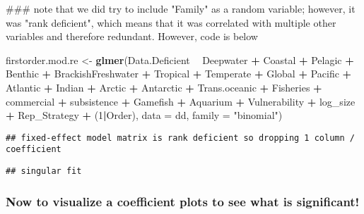 \documentclass[]{article}
\newenvironment{Shaded}{\begin{snugshade}}{\end{snugshade}}
\newcommand{\KeywordTok}[1]{\textcolor[rgb]{0.13,0.29,0.53}{\textbf{#1}}}
\newcommand{\DataTypeTok}[1]{\textcolor[rgb]{0.13,0.29,0.53}{#1}}
\newcommand{\DecValTok}[1]{\textcolor[rgb]{0.00,0.00,0.81}{#1}}
\newcommand{\StringTok}[1]{\textcolor[rgb]{0.31,0.60,0.02}{#1}}
\newcommand{\OperatorTok}[1]{\textcolor[rgb]{0.81,0.36,0.00}{\textbf{#1}}}
\newcommand{\NormalTok}[1]{#1}
\begin{document}
\begin{Shaded}
\begin{Highlighting}[]
\NormalTok{### note that we did try to include "Family" as a random variable; however, it was "rank deficient", which means that it was correlated with multiple other variables and therefore redundant. However, code is below}

\NormalTok{firstorder.mod.re <-}\StringTok{ }\KeywordTok{glmer}\NormalTok{(Data.Deficient }\OperatorTok{~}\StringTok{ }\NormalTok{Deepwater }\OperatorTok{+}\StringTok{ }\NormalTok{Coastal }\OperatorTok{+}\StringTok{ }\NormalTok{Pelagic }\OperatorTok{+}\StringTok{ }\NormalTok{Benthic }\OperatorTok{+}\StringTok{ }\NormalTok{BrackishFreshwater }\OperatorTok{+}\StringTok{ }
\StringTok{      }\NormalTok{Tropical }\OperatorTok{+}\StringTok{ }\NormalTok{Temperate }\OperatorTok{+}\StringTok{ }
\StringTok{      }\NormalTok{Global }\OperatorTok{+}\StringTok{ }\NormalTok{Pacific }\OperatorTok{+}\StringTok{ }\NormalTok{Atlantic }\OperatorTok{+}\StringTok{ }\NormalTok{Indian }\OperatorTok{+}\StringTok{ }\NormalTok{Arctic }\OperatorTok{+}\StringTok{ }\NormalTok{Antarctic }\OperatorTok{+}\StringTok{ }\NormalTok{Trans.oceanic }\OperatorTok{+}
\StringTok{      }\NormalTok{Fisheries }\OperatorTok{+}\StringTok{ }\NormalTok{commercial }\OperatorTok{+}\StringTok{ }\NormalTok{subsistence }\OperatorTok{+}\StringTok{ }\NormalTok{Gamefish }\OperatorTok{+}\StringTok{ }\NormalTok{Aquarium }\OperatorTok{+}\StringTok{ }\NormalTok{Vulnerability }\OperatorTok{+}\StringTok{ }
\StringTok{      }\NormalTok{log_size }\OperatorTok{+}\StringTok{ }\NormalTok{Rep_Strategy }\OperatorTok{+}
\StringTok{        }\NormalTok{(}\DecValTok{1}\OperatorTok{|}\NormalTok{Order), }\DataTypeTok{data =}\NormalTok{ dd, }\DataTypeTok{family =} \StringTok{"binomial"}\NormalTok{)}
\end{Highlighting}
\end{Shaded}

\begin{verbatim}
## fixed-effect model matrix is rank deficient so dropping 1 column / coefficient
\end{verbatim}

\begin{verbatim}
## singular fit
\end{verbatim}

\subsubsection{Now to visualize a coefficient plots to see what is
significant!}\label{now-to-visualize-a-coefficient-plots-to-see-what-is-significant}
\end{document}
